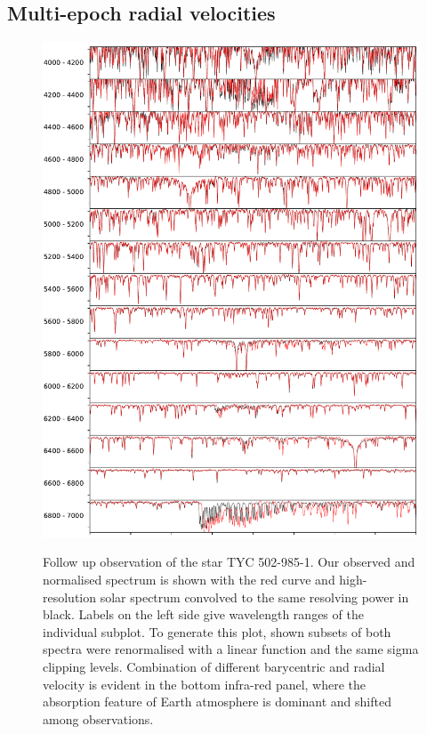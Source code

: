 \subsection{Multi-epoch radial velocities}
\label{sec:orbits_rv}

\begin{figure}
	\centering
	\includegraphics[width=\textwidth]{asiago_ref_comp.pdf}
	\label{fig:asiago_spectrum_twin}
	\caption{Follow up observation of the star TYC 502-985-1. Our observed and normalised spectrum is shown with the red curve and high-resolution solar spectrum convolved to the same resolving power in black. Labels on the left side give wavelength ranges of the individual subplot. To generate this plot, shown subsets of both spectra were renormalised with a linear function and the same sigma clipping levels. Combination of different barycentric and radial velocity is evident in the bottom infra-red panel, where the absorption feature of Earth atmosphere is dominant and shifted among observations.}
\end{figure}

